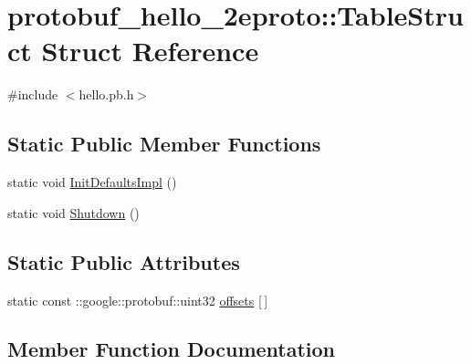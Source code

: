 \hypertarget{structprotobuf__hello__2eproto_1_1_table_struct}{}\section{protobuf\+\_\+hello\+\_\+2eproto\+:\+:Table\+Struct Struct Reference}
\label{structprotobuf__hello__2eproto_1_1_table_struct}


{\ttfamily \#include $<$hello.\+pb.\+h$>$}

\subsection*{Static Public Member Functions}
\begin{DoxyCompactItemize}
\item 
static void \hyperlink{structprotobuf__hello__2eproto_1_1_table_struct_a4ccc282a60540ec6707e4f06ffe2b8a7}{Init\+Defaults\+Impl} ()
\item 
static void \hyperlink{structprotobuf__hello__2eproto_1_1_table_struct_a3c09c688a81fe6c7f8f5bab91e6a3aa9}{Shutdown} ()
\end{DoxyCompactItemize}
\subsection*{Static Public Attributes}
\begin{DoxyCompactItemize}
\item 
static const \+::google\+::protobuf\+::uint32 \hyperlink{structprotobuf__hello__2eproto_1_1_table_struct_a840ebe7a0940d86cc4e6a328476460ec}{offsets} \mbox{[}$\,$\mbox{]}
\end{DoxyCompactItemize}


\subsection{Member Function Documentation}

